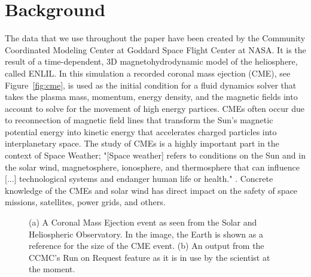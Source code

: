 \documentclass{egpubl}
\begin{document}
\section{Background}
\label{sec:background}
The data that we use throughout the paper have been created by the Community Coordinated Modeling Center at Goddard Space Flight Center at NASA. It is the result of a time-dependent, 3D magnetohydrodynamic model of the heliosphere, called ENLIL. In this simulation a recorded coronal mass ejection (CME), see Figure~\ref{fig:cme}, is used as the initial condition for a fluid dynamics solver that takes the plasma mass, momentum, energy density, and the magnetic fields into account to solve for the movement of high energy partices. CMEs often occur due to reconnection of magnetic field lines that transform the Sun's magnetic potential energy into kinetic energy that accelerates charged particles into interplanetary space. The study of CMEs is a highly important part in the context of Space Weather; "[Space weather] refers to conditions on the Sun and in the solar wind, magnetosphere, ionosphere, and thermosphere that can influence [...] technological systems and endanger human life or health." \cite{SpaceWeather95}. Concrete knowledge of the CMEs and solar wind has direct impact on the safety of space missions, satellites, power grids, and others.

\begin{figure}
	\centering
	\caption{(a) A Coronal Mass Ejection event as seen from the Solar and Heliospheric Observatory. In the image, the Earth is shown as a reference for the size of the CME event. (b) An output from the CCMC's Run on Request feature as it is in use by the scientist at the moment.}
\end{figure}
\end{document}
